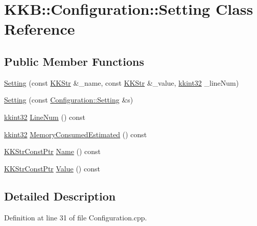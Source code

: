 \hypertarget{class_k_k_b_1_1_configuration_1_1_setting}{}\section{K\+KB\+:\+:Configuration\+:\+:Setting Class Reference}
\label{class_k_k_b_1_1_configuration_1_1_setting}
\subsection*{Public Member Functions}
\begin{DoxyCompactItemize}
\item 
\hyperlink{class_k_k_b_1_1_configuration_1_1_setting_a5b462de6eb944280e0bb634576269b86}{Setting} (const \hyperlink{class_k_k_b_1_1_k_k_str}{K\+K\+Str} \&\+\_\+name, const \hyperlink{class_k_k_b_1_1_k_k_str}{K\+K\+Str} \&\+\_\+value, \hyperlink{namespace_k_k_b_a8fa4952cc84fda1de4bec1fbdd8d5b1b}{kkint32} \+\_\+line\+Num)
\item 
\hyperlink{class_k_k_b_1_1_configuration_1_1_setting_a8f27de1b2ea6928fef90f1d90ffeeaa6}{Setting} (const \hyperlink{class_k_k_b_1_1_configuration_1_1_setting}{Configuration\+::\+Setting} \&s)
\item 
\hyperlink{namespace_k_k_b_a8fa4952cc84fda1de4bec1fbdd8d5b1b}{kkint32} \hyperlink{class_k_k_b_1_1_configuration_1_1_setting_a63f658602b0147eb3de7cfed15be02d6}{Line\+Num} () const 
\item 
\hyperlink{namespace_k_k_b_a8fa4952cc84fda1de4bec1fbdd8d5b1b}{kkint32} \hyperlink{class_k_k_b_1_1_configuration_1_1_setting_a822aa006918b3dfc06abcbadf6717479}{Memory\+Consumed\+Estimated} () const 
\item 
\hyperlink{namespace_k_k_b_a46f665ec17615c856eff3d21f78bed5c}{K\+K\+Str\+Const\+Ptr} \hyperlink{class_k_k_b_1_1_configuration_1_1_setting_a36eb5ba502d27443845f834157aefe97}{Name} () const 
\item 
\hyperlink{namespace_k_k_b_a46f665ec17615c856eff3d21f78bed5c}{K\+K\+Str\+Const\+Ptr} \hyperlink{class_k_k_b_1_1_configuration_1_1_setting_ac6ad492e5aff688f57a9a2de01db963d}{Value} () const 
\end{DoxyCompactItemize}


\subsection{Detailed Description}


Definition at line 31 of file Configuration.\+cpp.



